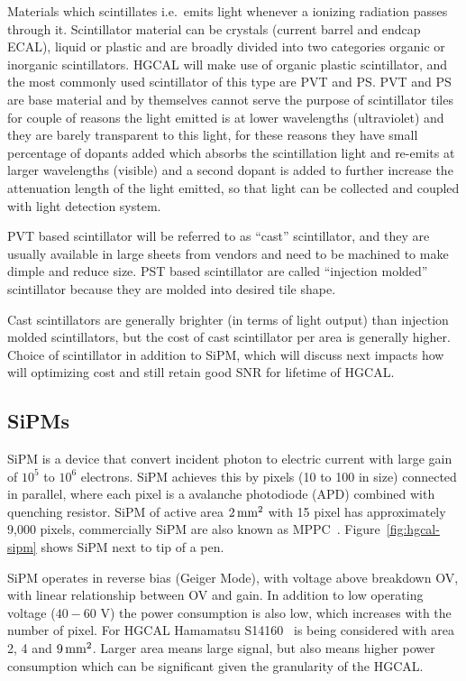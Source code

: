 Materials which scintillates i.e.~emits light
whenever a ionizing radiation passes through it.
Scintillator material can be crystals (current barrel and endcap
\gls{ECAL}), liquid or plastic and are broadly divided into two
categories organic or inorganic scintillators.
\gls{HGCAL} will make use of organic plastic scintillator, and the most
commonly used scintillator of this type are \gls{PVT} and \gls{PS}.
\gls{PVT} and \gls{PS} are base material and
by themselves cannot serve the purpose of scintillator tiles for couple of
reasons the light emitted is at lower wavelengths (ultraviolet)
and they are barely transparent to this light,
for these reasons they have small percentage of dopants added
which absorbs the scintillation light and re-emits at larger wavelengths (visible)
and a second dopant is added to further increase the attenuation length of
the light emitted, so that light can be collected and coupled with light
detection system.

\gls{PVT} based scintillator will be referred to as ``cast'' scintillator,
and they are usually available in large sheets from vendors and
need to be machined to make dimple and reduce size.
\gls{PST} based scintillator are called ``injection molded'' scintillator
because they are molded into desired tile shape.

Cast scintillators are generally brighter (in terms of light output)
than injection molded scintillators, but the cost of
cast scintillator per area is generally higher.
Choice of scintillator in addition to \gls{SiPM}, which will discuss next
impacts how will optimizing
cost and still retain good \gls{SNR} for lifetime of \gls{HGCAL}.

\subsection{
  SiPMs
}

\gls{SiPM} is a device that convert incident photon to electric
current with large gain of \( 10^5 \) to \( 10^6 \) electrons.
\gls{SiPM} achieves this by pixels (10\micron{} to 100\micron{} in size)
connected in parallel, where each pixel is a avalanche photodiode (APD)
combined with quenching resistor. \gls{SiPM} of active
area \( 2\,\text{mm}{}^2 \) with 15\micron{} pixel has approximately 9,000 pixels,
commercially \gls{SiPM} are also known as \gls{MPPC}~\cite{mppc-13360}. Figure~\ref{fig:hgcal-sipm}
shows \gls{SiPM} next to tip of a pen.

\gls{SiPM} operates in reverse bias (Geiger Mode),
with voltage above breakdown \gls{OV}, with linear relationship
between \gls{OV} and gain.
In addition to low operating voltage (\(40-60\) V) the power
consumption is also low, which increases with the number of pixel.
For \gls{HGCAL} Hamamatsu S14160~\cite{mppc-14160} is being considered with
area 2, 4 and \(9\,\text{mm}{}^2\). Larger area means large signal, but
also means higher power consumption which can be significant given
the granularity of the \gls{HGCAL}.

